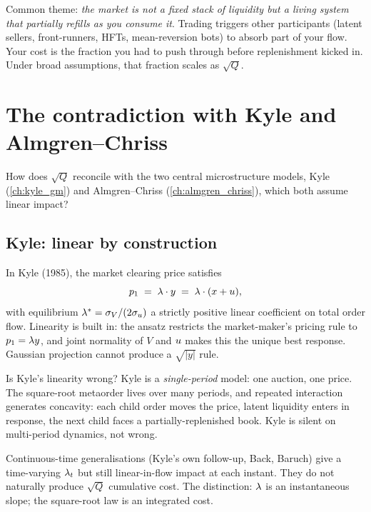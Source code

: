 \begin{intuitionbox}
Common theme: \emph{the market is not a fixed stack of liquidity but
a living system that partially refills as you consume it}. Trading
triggers other participants (latent sellers, front-runners, HFTs,
mean-reversion bots) to absorb part of your flow. Your cost is
the fraction you had to push through before replenishment kicked in.
Under broad assumptions, that fraction scales as $\sqrt{Q}$.
\end{intuitionbox}

\section{The contradiction with Kyle and Almgren--Chriss}
\label{sec:kyle_contradiction}

How does $\sqrt{Q}$ reconcile with the two central microstructure
models, Kyle (\cref{ch:kyle_gm}) and Almgren--Chriss
(\cref{ch:almgren_chriss}), which both assume linear impact?

\subsection{Kyle: linear by construction}
\label{subsec:kyle_linear_construction}

In Kyle (1985), the market clearing price satisfies
\[
  p_1 \;=\; \lambda \cdot y \;=\; \lambda \cdot (x + u),
\]
with equilibrium $\lambda^\ast = \sigma_V / (2 \sigma_u)$ a strictly
positive linear coefficient on total order flow. Linearity is built
in: the ansatz restricts the market-maker's pricing rule to $p_1 =
\lambda y$, and joint normality of $V$ and $u$ makes this the
unique best response. Gaussian projection cannot produce a
$\sqrt{|y|}$ rule.

Is Kyle's linearity wrong? Kyle is a \emph{single-period} model:
one auction, one price. The square-root metaorder lives over many
periods, and repeated interaction generates concavity: each
child order moves the price, latent liquidity enters in response,
the next child faces a partially-replenished book. Kyle is silent
on multi-period dynamics, not wrong.

Continuous-time generalisations (Kyle's own follow-up, Back, Baruch)
give a time-varying $\lambda_t$ but still linear-in-flow impact at each
instant. They do not naturally produce $\sqrt{Q}$ cumulative cost.
The distinction: $\lambda$ is an instantaneous slope; the square-root
law is an integrated cost.

